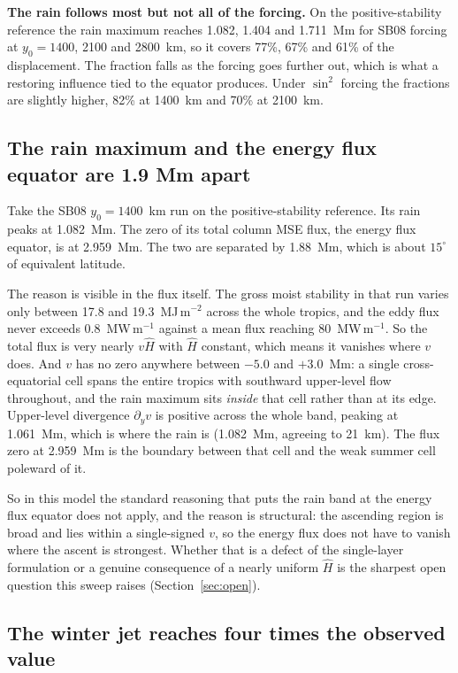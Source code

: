 \documentclass[11pt]{article}
\newcommand{\Hhat}{\hat{H}}
\newcommand{\py}{\partial_y}
\begin{document}
\textbf{The rain follows most but not all of the forcing.} On the
positive-stability reference the rain maximum reaches 1.082, 1.404 and
1.711~Mm for SB08 forcing at $y_0 = 1400$, 2100 and 2800~km, so it covers 77\%,
67\% and 61\% of the displacement. The fraction falls as the forcing goes
further out, which is what a restoring influence tied to the equator produces.
Under $\sin^2$ forcing the fractions are slightly higher, 82\% at 1400~km and
70\% at 2100~km.

\subsection{The rain maximum and the energy flux equator are 1.9 Mm apart}

Take the SB08 $y_0 = 1400$~km run on the positive-stability reference. Its rain
peaks at 1.082~Mm. The zero of its total column MSE flux, the energy flux
equator, is at 2.959~Mm. The two are separated by 1.88~Mm, which is about
$15^\circ$ of equivalent latitude.

The reason is visible in the flux itself. The gross moist stability in that run
varies only between 17.8 and 19.3~MJ\,m$^{-2}$ across the whole tropics, and the
eddy flux never exceeds 0.8~MW\,m$^{-1}$ against a mean flux reaching
80~MW\,m$^{-1}$. So the total flux is very nearly $v\Hhat$ with $\Hhat$
constant, which means it vanishes where $v$ does. And $v$ has no zero anywhere
between $-5.0$ and $+3.0$~Mm: a single cross-equatorial cell spans the entire
tropics with southward upper-level flow throughout, and the rain maximum sits
\emph{inside} that cell rather than at its edge. Upper-level divergence
$\py v$ is positive across the whole band, peaking at 1.061~Mm, which is where
the rain is (1.082~Mm, agreeing to 21~km). The flux zero at 2.959~Mm is the
boundary between that cell and the weak summer cell poleward of it.

So in this model the standard reasoning that puts the rain band at the energy
flux equator does not apply, and the reason is structural: the ascending region
is broad and lies within a single-signed $v$, so the energy flux does not have
to vanish where the ascent is strongest. Whether that is a defect of the
single-layer formulation or a genuine consequence of a nearly uniform $\Hhat$
is the sharpest open question this sweep raises
(Section~\ref{sec:open}).

\subsection{The winter jet reaches four times the observed value}
\end{document}
